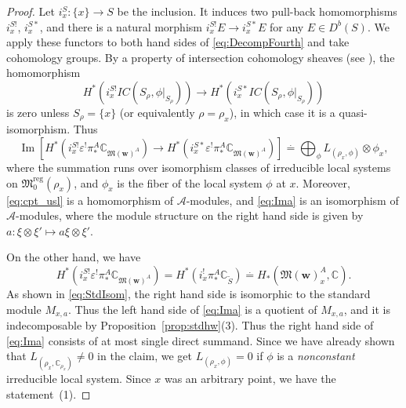 \documentclass[12pt]{amsart}
\def\Bbb{\mathbb}
\def\frak{\mathfrak}
\theoremstyle{definition}
\theoremstyle{remark}
\numberwithin{equation}{subsection}
\newcommand{\propref}[1]{Proposition~\ref{#1}}
\newcommand{\C}{{\Bbb C}}
\newcommand{\Ima}{\operatorname{Im}}
\newcommand{\M}{{\frak M}} %
\newcommand{\Mreg}{{\frak M_0^{\operatorname{reg}}}}
\newcommand{\bw}{{\mathbf w}} %
\newcommand{\ngpiso}{\overset{.}{=}}
\begin{document}
\begin{proof}
Let $i^S_x\colon \{x\}\to S$ be the inclusion. It induces two
pull-back homomorphisms $i^{S!}_x$, $i^{S*}_x$, and there is a
natural morphism $i^{S!}_x E \to i^{S*}_x E$ for any $E\in
D^b(S)$. We apply these functors to both hand sides of
\eqref{eq:DecompFourth} and take cohomology groups.
By a property of intersection cohomology
sheaves (see \cite[8.5.3]{Gi-book}), the homomorphism
\begin{equation}\label{eq:cpt_usl}
   H^*(i^{S!}_x IC(S_\rho,\phi|_{S_\rho})) \to
   H^*(i^{S*}_x IC(S_\rho,\phi|_{S_\rho}))
\end{equation}
is zero unless $S_\rho = \{x\}$ (or equivalently
$\rho = \rho_x$),
in which case it is a quasi-isomorphism.
%
Thus
\begin{equation}\label{eq:Ima}
   \Ima\left[
      H^*(i^{S!}_x \varepsilon^! \pi^A_* \C_{\M(\bw)^A})
    \to 
      H^*(i^{S*}_x \varepsilon^! \pi^A_* \C_{\M(\bw)^A})
    \right]
   \ngpiso \bigoplus_{\phi} L_{(\rho_x,\phi)}\otimes 
   \phi_{x},
\end{equation}
where the summation runs over isomorphism classes of irreducible local 
systems on $\Mreg(\rho_x)$,
%
and $\phi_{x}$ is the fiber of the local system $\phi$ at $x$.
%
Moreover, \eqref{eq:cpt_usl} is a homomorphism of
$\mathcal A$-modules, and \eqref{eq:Ima} is an isomorphism of
$\mathcal A$-modules, where the module structure on the right
hand side is given by $a\colon \xi\otimes\xi'\mapsto a\xi\otimes \xi'$.

On the other hand, we have 
\[
   H^*(i^{S!}_x \varepsilon^! \pi^A_* \C_{\M(\bw)^A})
   = H^*(i_x^! \pi^A_* \C_{\widetilde S})
   \ngpiso H_*(\M(\bw)^A_x,\C).
\]
As shown in \eqref{eq:StdIsom}, the right hand side is isomorphic to
the standard module $M_{x,a}$. Thus the left hand side of
\eqref{eq:Ima} is a quotient of $M_{x,a}$, and it is indecomposable by
\propref{prop:stdhw}(3). Thus the right hand side of \eqref{eq:Ima}
consists of at most single direct summand. Since we have already shown
that $L_{(\rho_x,\C_{\rho_x})}\neq 0$ in the claim, we get
\(
   L_{(\rho_x,\phi)} = 0
\)
if $\phi$ is a {\it nonconstant\/} irreducible local system. Since
$x$ was an arbitrary point, we have the statement~(1).


\end{proof}
\end{document}
